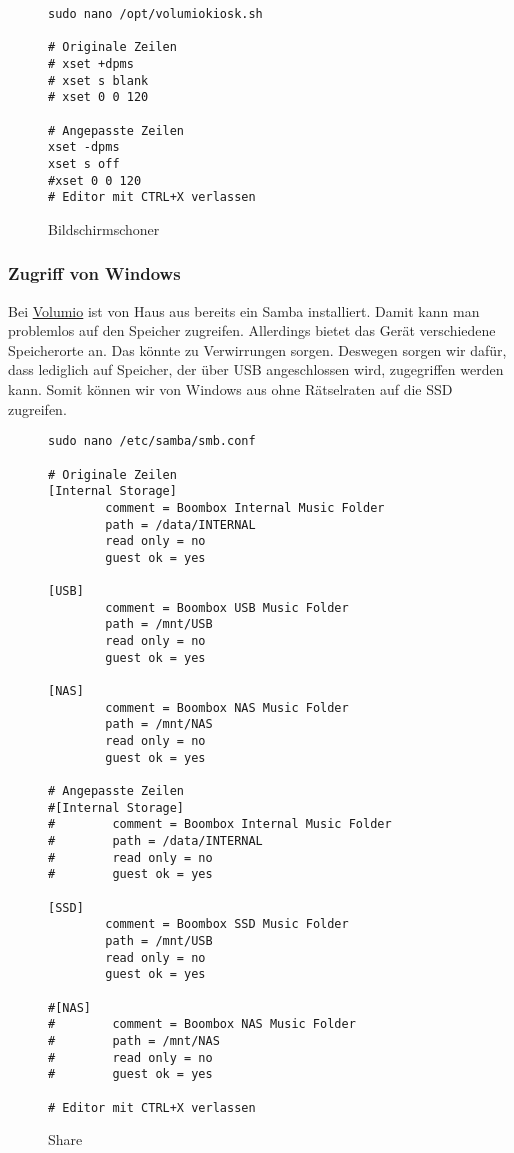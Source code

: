 \documentclass[12pt,a4paper]{article}
\newcommand{\vol}{\href{https://volumio.org/}{Volumio}\index{Volumio}}
\begin{document}
\begin{figure}[H]
\begin{lstlisting}
sudo nano /opt/volumiokiosk.sh

# Originale Zeilen
# xset +dpms
# xset s blank
# xset 0 0 120

# Angepasste Zeilen
xset -dpms
xset s off
#xset 0 0 120
# Editor mit CTRL+X verlassen
\end{lstlisting}
\caption{Bildschirmschoner}\label{fig:Bildschirmschoner}
\end{figure}

\newpage
\subsubsection{Zugriff von Windows}
Bei \vol{} ist von Haus aus bereits ein Samba installiert. Damit kann man problemlos auf den Speicher zugreifen. Allerdings bietet das Gerät verschiedene
Speicherorte an. Das könnte zu Verwirrungen sorgen. Deswegen sorgen wir dafür, dass lediglich auf Speicher, der über USB angeschlossen wird, zugegriffen werden
kann. Somit können wir von Windows aus ohne Rätselraten auf die SSD zugreifen.

\begin{figure}[H]
\begin{lstlisting}
sudo nano /etc/samba/smb.conf

# Originale Zeilen
[Internal Storage]
        comment = Boombox Internal Music Folder
        path = /data/INTERNAL
        read only = no
        guest ok = yes

[USB]
        comment = Boombox USB Music Folder
        path = /mnt/USB
        read only = no
        guest ok = yes

[NAS]
        comment = Boombox NAS Music Folder
        path = /mnt/NAS
        read only = no
        guest ok = yes

# Angepasste Zeilen
#[Internal Storage]
#        comment = Boombox Internal Music Folder
#        path = /data/INTERNAL
#        read only = no
#        guest ok = yes

[SSD]
        comment = Boombox SSD Music Folder
        path = /mnt/USB
        read only = no
        guest ok = yes

#[NAS]
#        comment = Boombox NAS Music Folder
#        path = /mnt/NAS
#        read only = no
#        guest ok = yes

# Editor mit CTRL+X verlassen
\end{lstlisting}
\caption{Share}\label{fig:Share}
\end{figure}
\end{document}
